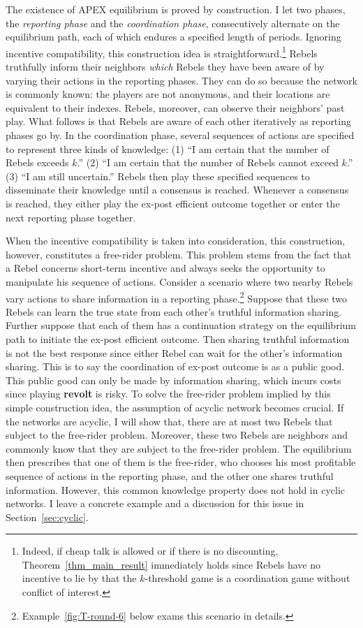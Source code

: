 \documentclass[12pt,letter]{article}
\theoremstyle{definition}
\theoremstyle{remark}
\theoremstyle{claim}
\begin{document}
The existence of APEX equilibrium is proved by construction. I let two phases, the \textit{reporting phase} and the \textit{coordination phase}, consecutively alternate on the equilibrium path, each of which endures a specified length of periods. Ignoring incentive compatibility, this construction idea is straightforward.\footnote{Indeed, if cheap talk is allowed or if there is no discounting, Theorem~\ref{thm_main_result} immediately holds since Rebels have no incentive to lie by that the $k$-threshold game is a coordination game without conflict of interest.} 
Rebels truthfully inform their neighbors \textit{which} Rebels they have been aware of by varying their actions in the reporting phases. They can do so because the network is commonly known: the players are not anonymous, and their locations are equivalent to their indexes. Rebels, moreover, can observe their neighbors' past play. What follows is that Rebels are aware of each other iteratively as reporting phases go by. In the coordination phase, several sequences of actions are specified to represent three kinds of knowledge: (1) ``I am certain that the number of Rebels exceeds $k$.'' (2) ``I am certain that the number of Rebels cannot exceed $k$.'' (3) ``I am still uncertain.'' Rebels then play these specified sequences to disseminate their knowledge until a consensus is reached. Whenever a consensus is reached, they either play the ex-post efficient outcome together or enter the next reporting phase together.


When the incentive compatibility is taken into consideration, this construction, however, constitutes a free-rider problem. This problem stems from the fact that a Rebel concerns short-term incentive and always seeks the opportunity to manipulate his sequence of actions. Consider a scenario where two nearby Rebels vary actions to share information in a reporting phase.\footnote{Example~\ref{fig:T-round-6} below exams this scenario in details.}
Suppose that these two Rebels can learn the true state from each other's truthful information sharing. Further suppose that each of them has a continuation strategy on the equilibrium path to initiate the ex-post efficient outcome. Then sharing truthful information is not the best response since either Rebel can wait for the other's information sharing. This is to say the coordination of ex-post outcome is as a public good. This public good can only be made by information sharing, which incurs costs since playing \textbf{revolt} is risky. To solve the free-rider problem implied by this simple construction idea, the assumption of acyclic network becomes crucial. If the networks are acyclic, I will show that, there are at most two Rebels that subject to the free-rider problem. Moreover, these two Rebels are neighbors and commonly know that they are subject to the free-rider problem. The equilibrium then prescribes that one of them is the free-rider, who chooses his most profitable sequence of actions in the reporting phase, and the other one shares truthful information. However, this common knowledge property does not hold in cyclic networks. I leave a concrete example and a discussion for this issue in Section~\ref{sec:cyclic}.
\end{document}
